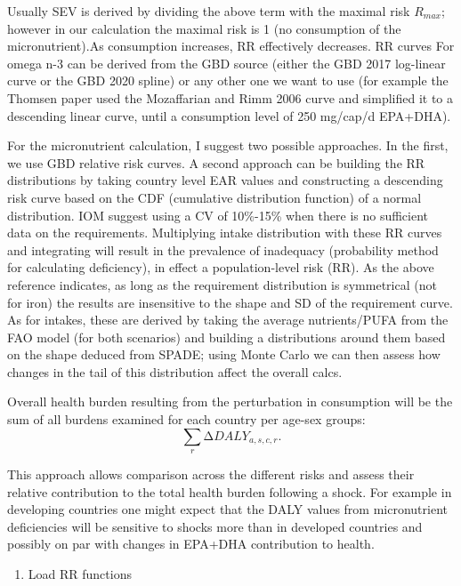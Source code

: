 \documentclass[
]{article}
\providecommand{\tightlist}{%
  \setlength{\itemsep}{0pt}\setlength{\parskip}{0pt}}
\begin{document}
Usually SEV is derived by dividing the above term with the maximal risk
\(R_{max}\); however in our calculation the maximal risk is 1 (no
consumption of the micronutrient).As consumption increases, RR
effectively decreases. RR curves For omega n-3 can be derived from the
GBD source (either the GBD 2017 log-linear curve or the GBD 2020 spline)
or any other one we want to use (for example the Thomsen paper used the
Mozaffarian and Rimm 2006 curve and simplified it to a descending linear
curve, until a consumption level of 250 mg/cap/d EPA+DHA).

For the micronutrient calculation, I suggest two possible approaches. In
the first, we use GBD relative risk curves. A second approach can be
building the RR distributions by taking country level EAR values and
constructing a descending risk curve based on the CDF (cumulative
distribution function) of a normal distribution. IOM suggest using a CV
of 10\%-15\% when there is no sufficient data on the requirements.
Multiplying intake distribution with these RR curves and integrating
will result in the prevalence of inadequacy (probability method for
calculating deficiency), in effect a population-level risk (RR). As the
above reference indicates, as long as the requirement distribution is
symmetrical (not for iron) the results are insensitive to the shape and
SD of the requirement curve. As for intakes, these are derived by taking
the average nutrients/PUFA from the FAO model (for both scenarios) and
building a distributions around them based on the shape deduced from
SPADE; using Monte Carlo we can then assess how changes in the tail of
this distribution affect the overall calcs.

Overall health burden resulting from the perturbation in consumption
will be the sum of all burdens examined for each country per age-sex
groups: \[∑_{r}∆DALY_{a,s,c,r}.\]

This approach allows comparison across the different risks and assess
their relative contribution to the total health burden following a
shock. For example in developing countries one might expect that the
DALY values from micronutrient deficiencies will be sensitive to shocks
more than in developed countries and possibly on par with changes in
EPA+DHA contribution to health.

\begin{enumerate}
\def\labelenumi{\arabic{enumi}.}
\tightlist
\item
  Load RR functions
\end{enumerate}
\end{document}

